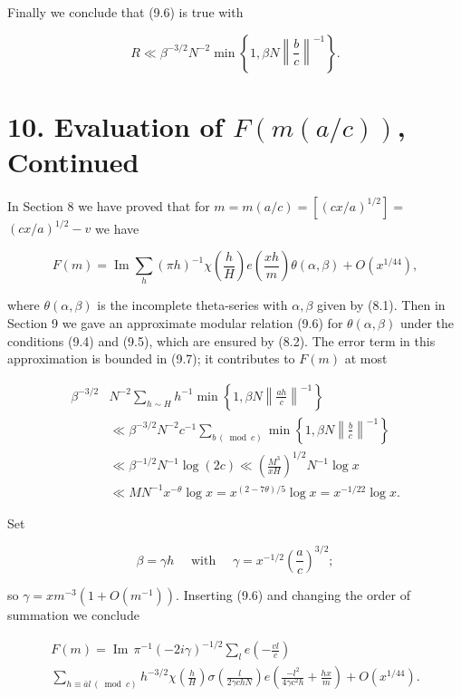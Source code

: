 \documentclass[10pt]{article}
\begin{document}
Finally we conclude that (9.6) is true with


\begin{equation*}
R \ll \beta^{-3 / 2} N^{-2} \min \left\{1, \beta N\left\|\frac{b}{c}\right\|^{-1}\right\} . \tag{9.7}
\end{equation*}


\section*{10. Evaluation of $F(m(a / c))$, Continued}
In Section 8 we have proved that for $m=m(a / c)=\left[(c x / a)^{1 / 2}\right]=$ $(c x / a)^{1 / 2}-v$ we have

$$
F(m)=\operatorname{Im}\sum_{h}(\pi h)^{-1} \chi\left(\frac{h}{H}\right) e\left(\frac{x h}{m}\right) \theta(\alpha, \beta)+O\left(x^{1 / 44}\right),
$$

where $\theta(\alpha, \beta)$ is the incomplete theta-series with $\alpha, \beta$ given by (8.1). Then in Section 9 we gave an approximate modular relation (9.6) for $\theta(\alpha, \beta)$ under the conditions (9.4) and (9.5), which are ensured by (8.2). The error term in this approximation is bounded in (9.7); it contributes to $F(m)$ at most

$$
\begin{aligned}
\beta^{-3 / 2} & N^{-2} \sum_{h \sim H} h^{-1} \min \left\{1, \beta N\left\|\frac{a h}{c}\right\|^{-1}\right\} \\
& \ll \beta^{-3 / 2} N^{-2} c^{-1} \sum_{b\, (\bmod c)} \min \left\{1, \beta N\left\|\frac{b}{c}\right\|^{-1}\right\} \\
& \ll\beta^{-1/2}N^{-1}\log(2c)\ll\left(\frac{M^{3}}{x H}\right)^{1 / 2} N^{-1} \log x \\
& \ll M N^{-1} x^{-\theta} \log x=x^{(2-7 \theta) / 5} \log x=x^{-1 / 22} \log x .
\end{aligned}
$$

Set


\begin{equation*}
\beta=\gamma h \quad \text { with } \quad \gamma=x^{-1 / 2}\left(\frac{a}{c}\right)^{3 / 2} ; \tag{10.1}
\end{equation*}


so $\gamma=x m^{-3}\left(1+O\left(m^{-1}\right)\right)$. Inserting (9.6) and changing the order of summation we conclude

$$
\begin{gathered}
F(m)=\operatorname{Im}\,\pi^{-1}(-2 i \gamma)^{-1 / 2} \sum_{l} e\left(-\frac{v l}{c}\right) \\
\sum_{h\equiv\bar a l\, (\bmod c)} h^{-3 / 2} \chi\left(\frac{h}{H}\right) \sigma\left(\frac{l}{2 \gamma c h N}\right) e\left(\frac{-l^{2}}{4 \gamma c^{2} h}+\frac{h x}{m}\right)+O\left(x^{1 / 44}\right) .
\end{gathered}
$$
\end{document}
